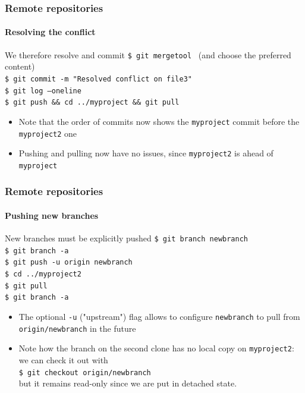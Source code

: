 \begin{frame}
\frametitle{Remote repositories}
\framesubtitle{Resolving the conflict}

\begin{block}{We therefore resolve and commit}
\texttt{\$ git mergetool} \,\,\,(and choose the preferred content)\\
\texttt{\$ git commit -m "Resolved conflict on file3"} \\
\texttt{\$ git log ---oneline} \\
\texttt{\$ git push \&\& cd ../myproject \&\& git pull} 

\begin{itemize}
\item Note that the order of commits now shows the \texttt{myproject} commit before the \texttt{myproject2} one
\item Pushing and pulling now have no issues, since \texttt{myproject2} is ahead of \texttt{myproject}
\end{itemize}
\end{block}

\end{frame}

\begin{frame}
\frametitle{Remote repositories}
\framesubtitle{Pushing new branches}

\begin{block}{New branches must be explicitly pushed}
\texttt{\$ git branch newbranch} \\
\texttt{\$ git branch -a} \\
\texttt{\$ git push -u origin newbranch} \\
\texttt{\$ cd ../myproject2} \\
\texttt{\$ git pull} \\
\texttt{\$ git branch -a}

\begin{itemize}
\item The optional \texttt{-u} ("upstream") flag allows to configure \texttt{newbranch} to pull from \texttt{origin/newbranch} in the future
\item Note how the branch on the second clone has no local copy on \texttt{myproject2}: we can check it out with \\
\texttt{\$ git checkout origin/newbranch} \\
but it remains read-only since we are put in detached state.
\end{itemize}
\end{block}

\end{frame}

